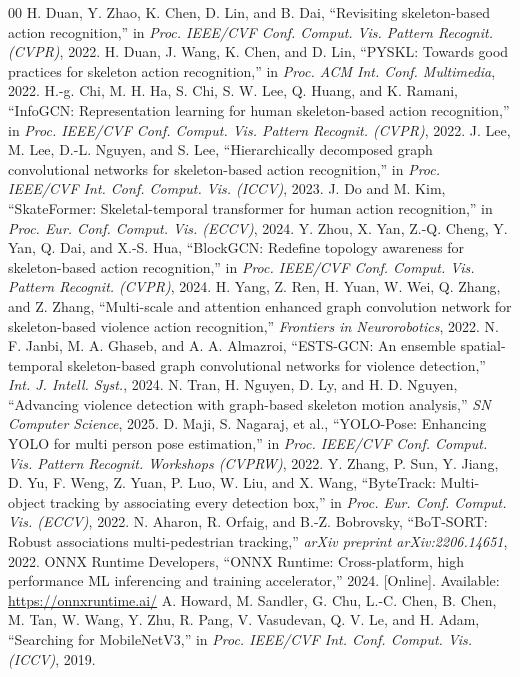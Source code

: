 \documentclass[conference]{IEEEtran}
\begin{document}
\begin{thebibliography}{00}
 H. Duan, Y. Zhao, K. Chen, D. Lin, and B. Dai, ``Revisiting skeleton-based action recognition,'' in \textit{Proc. IEEE/CVF Conf. Comput. Vis. Pattern Recognit. (CVPR)}, 2022.
 H. Duan, J. Wang, K. Chen, and D. Lin, ``PYSKL: Towards good practices for skeleton action recognition,'' in \textit{Proc. ACM Int. Conf. Multimedia}, 2022.
 H.-g. Chi, M. H. Ha, S. Chi, S. W. Lee, Q. Huang, and K. Ramani, ``InfoGCN: Representation learning for human skeleton-based action recognition,'' in \textit{Proc. IEEE/CVF Conf. Comput. Vis. Pattern Recognit. (CVPR)}, 2022.
 J. Lee, M. Lee, D.-L. Nguyen, and S. Lee, ``Hierarchically decomposed graph convolutional networks for skeleton-based action recognition,'' in \textit{Proc. IEEE/CVF Int. Conf. Comput. Vis. (ICCV)}, 2023.
 J. Do and M. Kim, ``SkateFormer: Skeletal-temporal transformer for human action recognition,'' in \textit{Proc. Eur. Conf. Comput. Vis. (ECCV)}, 2024.
 Y. Zhou, X. Yan, Z.-Q. Cheng, Y. Yan, Q. Dai, and X.-S. Hua, ``BlockGCN: Redefine topology awareness for skeleton-based action recognition,'' in \textit{Proc. IEEE/CVF Conf. Comput. Vis. Pattern Recognit. (CVPR)}, 2024.
 H. Yang, Z. Ren, H. Yuan, W. Wei, Q. Zhang, and Z. Zhang, ``Multi-scale and attention enhanced graph convolution network for skeleton-based violence action recognition,'' \textit{Frontiers in Neurorobotics}, 2022.
 N. F. Janbi, M. A. Ghaseb, and A. A. Almazroi, ``ESTS-GCN: An ensemble spatial-temporal skeleton-based graph convolutional networks for violence detection,'' \textit{Int. J. Intell. Syst.}, 2024.
 N. Tran, H. Nguyen, D. Ly, and H. D. Nguyen, ``Advancing violence detection with graph-based skeleton motion analysis,'' \textit{SN Computer Science}, 2025.
 D. Maji, S. Nagaraj, et al., ``YOLO-Pose: Enhancing YOLO for multi person pose estimation,'' in \textit{Proc. IEEE/CVF Conf. Comput. Vis. Pattern Recognit. Workshops (CVPRW)}, 2022.
 Y. Zhang, P. Sun, Y. Jiang, D. Yu, F. Weng, Z. Yuan, P. Luo, W. Liu, and X. Wang, ``ByteTrack: Multi-object tracking by associating every detection box,'' in \textit{Proc. Eur. Conf. Comput. Vis. (ECCV)}, 2022.
 N. Aharon, R. Orfaig, and B.-Z. Bobrovsky, ``BoT-SORT: Robust associations multi-pedestrian tracking,'' \textit{arXiv preprint arXiv:2206.14651}, 2022.
 ONNX Runtime Developers, ``ONNX Runtime: Cross-platform, high performance ML inferencing and training accelerator,'' 2024. [Online]. Available: \url{https://onnxruntime.ai/}
 A. Howard, M. Sandler, G. Chu, L.-C. Chen, B. Chen, M. Tan, W. Wang, Y. Zhu, R. Pang, V. Vasudevan, Q. V. Le, and H. Adam, ``Searching for MobileNetV3,'' in \textit{Proc. IEEE/CVF Int. Conf. Comput. Vis. (ICCV)}, 2019.
\end{thebibliography}
\end{document}
